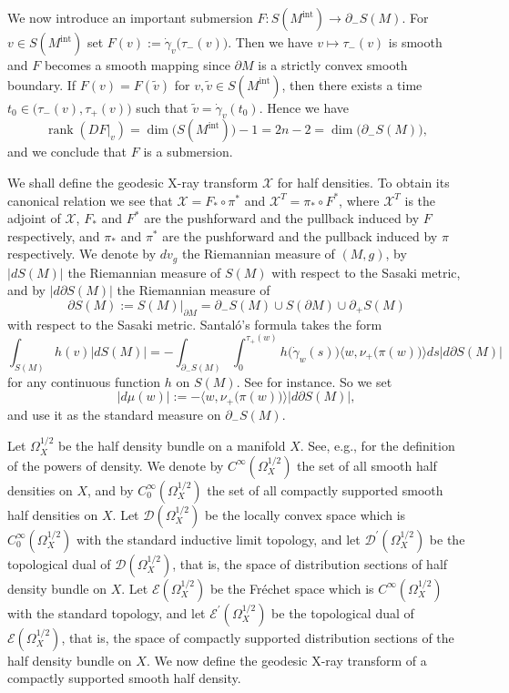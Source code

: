 \documentclass[a4paper,11pt,reqno]{amsart}
\numberwithin{equation}{section}
\theoremstyle{definition}
\theoremstyle{remark}
\begin{document}
%
%
\par
%
%
We now introduce an important submersion $F:S(M^\text{int}) \rightarrow \partial_-S(M)$. For $v \in S(M^\text{int})$ set $F(v):=\dot{\gamma}_v\bigl(\tau_-(v)\bigr)$. Then we have $v \mapsto \tau_-(v)$ is smooth and $F$ becomes a smooth mapping since $\partial{M}$ is a strictly convex smooth boundary. 
If $F(v)=F(\tilde{v})$ for $v,\tilde{v} \in S(M^\text{int})$, then there exists a time $t_0\in\bigl(\tau_-(v),\tau_+(v)\bigr)$ such that $\tilde{v}=\dot{\gamma}_v(t_0)$. Hence we have 
%
%
$$
\operatorname{rank}(DF\vert_v)
=
\operatorname{dim}\bigl(S(M^\text{int})\bigr)-1
=
2n-2
=
\operatorname{dim}\bigl(\partial_-S(M)\bigr), 
$$ 
%
%
and we conclude that $F$ is a submersion. 
%
%
\par
%
%
We shall define the geodesic X-ray transform $\mathcal{X}$ for half densities. 
To obtain its canonical relation we see that 
$\mathcal{X}=F_\ast{\circ}\pi^\ast$ and $\mathcal{X}^T=\pi_\ast{\circ}F^\ast$, 
where $\mathcal{X}^T$ is the adjoint of $\mathcal{X}$, 
$F_\ast$ and $F^\ast$ are the pushforward and the pullback induced by $F$ respectively, 
and $\pi_\ast$ and $\pi^\ast$ are the pushforward and the pullback induced by $\pi$ respectively. 
We denote by $dv_g$ the Riemannian measure of $(M,g)$, 
by $\lvert{dS(M)}\rvert$ the Riemannian measure of $S(M)$ with respect to the Sasaki metric, 
and by $\lvert{d\partial{S(M)}}\rvert$  the Riemannian measure of 
%
%
$$
{\partial}S(M):=S(M)\lvert_{\partial{M}}=\partial_-S(M) \cup S(\partial{M}) \cup \partial_+S(M)
$$
%
%
with respect to the Sasaki metric. 
Santal\'o's formula takes the form   
%
%
\begin{equation}
\int_{S(M)}h(v)\lvert{dS(M)}\rvert
=
-
\int_{\partial_-S(M)}
\int_0^{\tau_+(w)}
h\bigl(\dot{\gamma}_w(s)\bigr)
\bigl\langle{w,\nu_+\bigl(\pi(w)\bigr)}\bigr\rangle
ds
\lvert{d\partial{S(M)}}\rvert
\label{equation:santalo}
\end{equation}
%
%
for any continuous function $h$ on $S(M)$. 
See \cite[Theorem~8.4.1]{Sharafutdinov} for instance. 
So we set 
%
%
$$
\lvert{d\mu(w)}\rvert:=-\bigl\langle{w,\nu_+\bigl(\pi(w)\bigr)}\bigr\rangle\lvert{d\partial{S(M)}}\rvert,
$$
%
% 
and use it as the standard measure on $\partial_-S(M)$. 
%
%
\par
%
%
Let $\Omega_X^{1/2}$ be the half density bundle on a manifold $X$. See, e.g., \cite[page 92]{Hoermander3} for the definition of the powers of density. We denote by $C^\infty(\Omega_X^{1/2})$ the set of all smooth half densities on $X$, and by $C^\infty_0(\Omega_X^{1/2})$ the set of all compactly supported smooth half densities on $X$. Let $\mathscr{D}(\Omega_X^{1/2})$ be the locally convex space which is $C^\infty_0(\Omega_X^{1/2})$ with the standard inductive limit topology, and let $\mathscr{D}^\prime(\Omega_X^{1/2})$ be the topological dual of $\mathscr{D}(\Omega_X^{1/2})$, that is, the space of distribution sections of half density bundle on $X$. Let $\mathscr{E}(\Omega_X^{1/2})$ be the Fr\'echet space which is $C^\infty(\Omega_X^{1/2})$ with the standard topology, and let $\mathscr{E}^\prime(\Omega_X^{1/2})$ be the topological dual of $\mathscr{E}(\Omega_X^{1/2})$, that is, the space of compactly supported distribution sections of the half density bundle on $X$. We now define the geodesic X-ray transform of a compactly supported smooth half density. 
\end{document}

